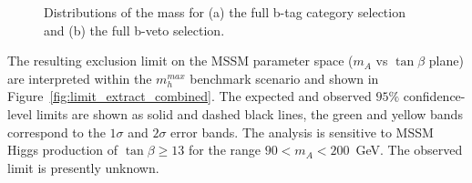 \begin{figure}[htp]
     \begin{center}

    \end{center}
    \caption{Distributions of the \mmc mass for (a) the full b-tag category selection and (b) the full b-veto selection.}
   \label{fig:mmc_categories}
\end{figure}


The resulting exclusion limit on the MSSM parameter space ($m_A$ vs $\tan\beta$ plane) are interpreted 
within the $m_{h}^{max}$ benchmark scenario \cite{MSSMmhmax} and  shown in 
%
Figure~\ref{fig:limit_extract_combined}. %
%
The expected and observed $95\%$ confidence-level limits are shown as solid and dashed black lines, the green 
and yellow bands correspond to the $1\sigma$ and $2\sigma$ error bands. 
The analysis is sensitive to MSSM Higgs production of $\tan\beta \geq 13$ for the range $90<m_A<200$~GeV.
The observed limit is presently unknown. %


